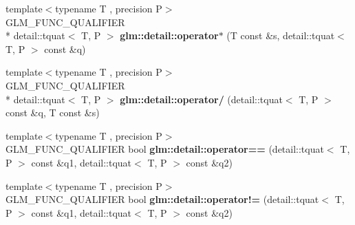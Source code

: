\begin{DoxyCompactItemize}
\item 
\hypertarget{namespaceglm_1_1detail_a935c219439467864d00ca30e5620a4e1}{{\footnotesize template$<$typename T , precision P$>$ }\\G\-L\-M\-\_\-\-F\-U\-N\-C\-\_\-\-Q\-U\-A\-L\-I\-F\-I\-E\-R \\*
detail\-::tquat$<$ T, P $>$ {\bfseries glm\-::detail\-::operator$\ast$} (T const \&s, detail\-::tquat$<$ T, P $>$ const \&q)}\label{namespaceglm_1_1detail_a935c219439467864d00ca30e5620a4e1}

\item 
\hypertarget{namespaceglm_1_1detail_ac97f2ce870d9bf40b6108d05f8371242}{{\footnotesize template$<$typename T , precision P$>$ }\\G\-L\-M\-\_\-\-F\-U\-N\-C\-\_\-\-Q\-U\-A\-L\-I\-F\-I\-E\-R \\*
detail\-::tquat$<$ T, P $>$ {\bfseries glm\-::detail\-::operator/} (detail\-::tquat$<$ T, P $>$ const \&q, T const \&s)}\label{namespaceglm_1_1detail_ac97f2ce870d9bf40b6108d05f8371242}

\item 
\hypertarget{namespaceglm_1_1detail_aaa2da89669d53c8809c654fcba9ac875}{{\footnotesize template$<$typename T , precision P$>$ }\\G\-L\-M\-\_\-\-F\-U\-N\-C\-\_\-\-Q\-U\-A\-L\-I\-F\-I\-E\-R bool {\bfseries glm\-::detail\-::operator==} (detail\-::tquat$<$ T, P $>$ const \&q1, detail\-::tquat$<$ T, P $>$ const \&q2)}\label{namespaceglm_1_1detail_aaa2da89669d53c8809c654fcba9ac875}

\item 
\hypertarget{namespaceglm_1_1detail_a7a8bcff114f9833b09ab0da9af5232f1}{{\footnotesize template$<$typename T , precision P$>$ }\\G\-L\-M\-\_\-\-F\-U\-N\-C\-\_\-\-Q\-U\-A\-L\-I\-F\-I\-E\-R bool {\bfseries glm\-::detail\-::operator!=} (detail\-::tquat$<$ T, P $>$ const \&q1, detail\-::tquat$<$ T, P $>$ const \&q2)}\label{namespaceglm_1_1detail_a7a8bcff114f9833b09ab0da9af5232f1}


\end{DoxyCompactItemize}
